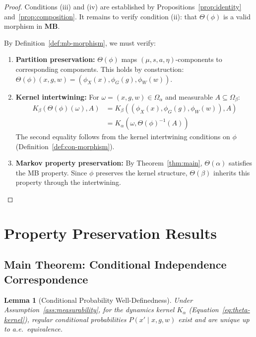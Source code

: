 \documentclass[11pt,a4paper]{article}
\theoremstyle{definition}
\theoremstyle{plain}
\newtheorem{lemma}[definition]{Lemma}
\theoremstyle{remark}
\newcommand{\MB}{\mathbf{MB}}
\begin{document}
\begin{proof}
Conditions (iii) and (iv) are established by Propositions~\ref{prop:identity} and~\ref{prop:composition}. It remains to verify condition (ii): that $\Theta(\phi)$ is a valid morphism in $\MB$.

By Definition~\ref{def:mb-morphism}, we must verify:
\begin{enumerate}
    \item \textbf{Partition preservation:} $\Theta(\phi)$ maps $(\mu, s, a, \eta)$-components to corresponding components. This holds by construction: $\Theta(\phi)(x, g, w) = (\phi_X(x), \phi_G(g), \phi_W(w))$.

    \item \textbf{Kernel intertwining:} For $\omega = (x, g, w) \in \Omega_\alpha$ and measurable $A \subseteq \Omega_\beta$:
    \begin{align*}
    K_\beta(\Theta(\phi)(\omega), A) &= K_\beta((\phi_X(x), \phi_G(g), \phi_W(w)), A) \\
    &= K_\alpha(\omega, \Theta(\phi)^{-1}(A))
    \end{align*}
    The second equality follows from the kernel intertwining conditions on $\phi$ (Definition~\ref{def:con-morphism}).

    \item \textbf{Markov property preservation:} By Theorem~\ref{thm:main}, $\Theta(\alpha)$ satisfies the MB property. Since $\phi$ preserves the kernel structure, $\Theta(\beta)$ inherits this property through the intertwining.
\end{enumerate}
\end{proof}

\section{Property Preservation Results}

\subsection{Main Theorem: Conditional Independence Correspondence}

\begin{lemma}[Conditional Probability Well-Definedness]\label{lem:conditional-welldefined}
Under Assumption~\ref{ass:measurability}, for the dynamics kernel $K_\alpha$ (Equation~\ref{eq:theta-kernel}), regular conditional probabilities $P(x' \mid x, g, w)$ exist and are unique up to a.e.\ equivalence.
\end{lemma}
\end{document}
